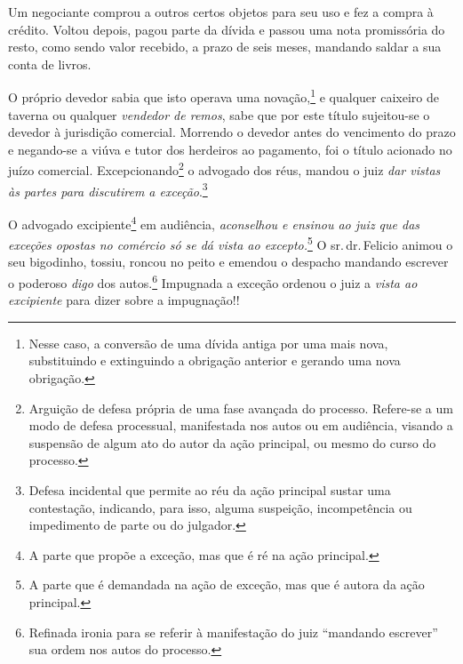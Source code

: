 \asterisc{}

Um negociante comprou a outros certos objetos para seu uso e fez a
compra à crédito. Voltou depois, pagou parte da dívida e passou uma nota
promissória do resto, como sendo valor recebido, a prazo de seis meses,
mandando saldar a sua conta de livros.

O próprio devedor sabia que isto operava uma novação,\footnote{ Nesse
  caso, a conversão de uma dívida antiga por uma mais nova, substituindo
  e extinguindo a obrigação anterior e gerando uma nova obrigação.} e
qualquer caixeiro de taverna ou qualquer \emph{vendedor de remos}, sabe
que por este título sujeitou-se o devedor à jurisdição comercial.
Morrendo o devedor antes do vencimento do prazo e negando-se a viúva e
tutor dos herdeiros ao pagamento, foi o título acionado no juízo
comercial. Excepcionando\footnote{ Arguição de defesa própria de uma
  fase avançada do processo. Refere-se a um modo de defesa processual,
  manifestada nos autos ou em audiência, visando a suspensão de algum
  ato do autor da ação principal, ou mesmo do curso do processo.} o
advogado dos réus, mandou o juiz \emph{dar vistas às partes para
discutirem a exceção}.\footnote{ Defesa incidental que permite ao réu
  da ação principal sustar uma contestação, indicando, para isso, alguma
  suspeição, incompetência ou impedimento de parte ou do julgador.}

O advogado excipiente\footnote{ A parte que propõe a exceção, mas que é
  ré na ação principal.} em audiência, \emph{aconselhou e ensinou ao
juiz que das exceções opostas no comércio só se dá vista ao
excepto.}\footnote{ A parte que é demandada na ação de exceção, mas que
  é autora da ação principal.} O sr.\,dr.\,Felicio animou o seu bigodinho,
tossiu, roncou no peito e emendou o despacho mandando escrever o
poderoso \emph{digo} dos autos.\footnote{ Refinada ironia para se
  referir à manifestação do juiz ``mandando escrever'' sua ordem nos autos
  do processo.} Impugnada a exceção ordenou o juiz a \emph{vista ao
excipiente} para dizer sobre a impugnação!!

